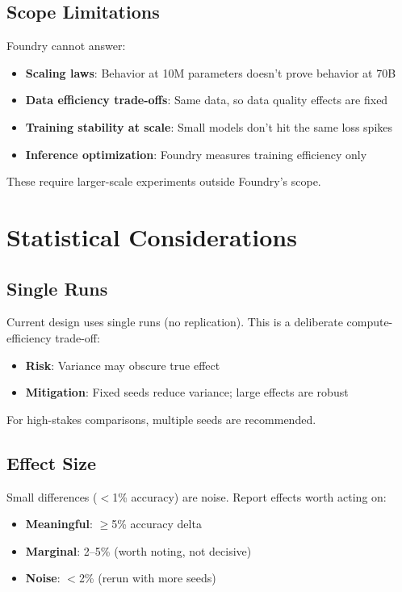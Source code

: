 \documentclass{article}
\begin{document}
\subsection{Scope Limitations}

Foundry cannot answer:

\begin{itemize}
  \item \textbf{Scaling laws}: Behavior at 10M parameters doesn't prove behavior at 70B
  \item \textbf{Data efficiency trade-offs}: Same data, so data quality effects are fixed
  \item \textbf{Training stability at scale}: Small models don't hit the same loss spikes
  \item \textbf{Inference optimization}: Foundry measures training efficiency only
\end{itemize}

These require larger-scale experiments outside Foundry's scope.

\section{Statistical Considerations}

\subsection{Single Runs}

Current design uses single runs (no replication). This is a deliberate compute-efficiency trade-off:

\begin{itemize}
  \item \textbf{Risk}: Variance may obscure true effect
  \item \textbf{Mitigation}: Fixed seeds reduce variance; large effects are robust
\end{itemize}

For high-stakes comparisons, multiple seeds are recommended.

\subsection{Effect Size}

Small differences ($<$1\% accuracy) are noise. Report effects worth acting on:

\begin{itemize}
  \item \textbf{Meaningful}: $\geq$5\% accuracy delta
  \item \textbf{Marginal}: 2--5\% (worth noting, not decisive)
  \item \textbf{Noise}: $<$2\% (rerun with more seeds)
\end{itemize}
\end{document}
